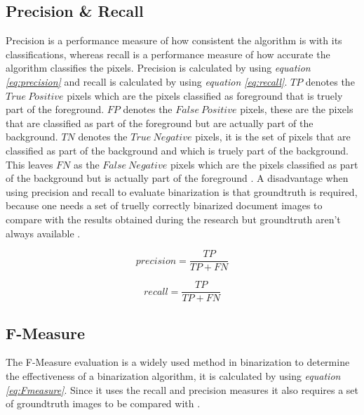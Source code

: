 \documentclass[11pt]{article}
\begin{document}
		\subsection{Precision \& Recall}
		Precision is a performance measure of how consistent the algorithm is with its classifications, whereas recall is a performance measure of how accurate the algorithm classifies the pixels. Precision is calculated by using \textit{equation \ref{eq:precision}} and recall is calculated by using \textit{equation \ref{eq:recall}}. $TP$ denotes the $True\ Positive$ pixels which are the pixels classified as foreground that is truely part of the foreground. $FP$ denotes the $False\ Positive$ pixels, these are the pixels that are classified as part of the foreground but are actually part of the background. $TN$ denotes the $True\ Negative$ pixels, it is the set of pixels that are classified as part of the background and which is truely part of the background. This leaves $FN$ as the $False\ Negative$ pixels which are the pixels classified as part of the background but is actually part of the foreground \cite{fawcett2006introduction}. A disadvantage when using precision and recall to evaluate binarization is that groundtruth is required, because one needs a set of truelly correctly binarized document images to compare with the results obtained during the research but groundtruth aren't always available \cite{ntirogiannis2013performance}.

		\begin{large}
		\begin{equation} \label{eq:precision}
		precision = \frac{TP}{TP + FN}
		\end{equation}
		\end{large}

		\begin{large}
		\begin{equation} \label{eq:recall}
		recall = \frac{TP}{TP + FN}
		\end{equation}
		\end{large}

		\subsection{F-Measure}
			The F-Measure evaluation is a widely used method in binarization to determine the effectiveness of a binarization algorithm, it is calculated by using \textit{equation \ref{eq:Fmeasure}}. Since it uses the recall and precision measures it also requires a set of groundtruth images to be compared with \cite{ntirogiannis2008objective}.
\end{document}
